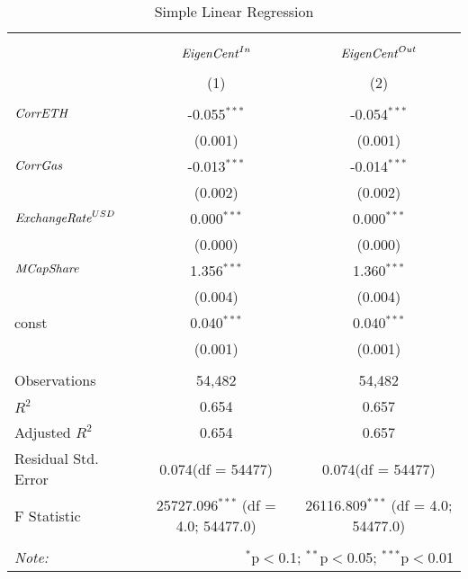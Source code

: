 \begin{table}[!htbp] \centering
  \caption{Simple Linear Regression}
\begin{tabular}{@{\extracolsep{5pt}}lcc}
\\[-1.8ex]\hline
\hline \\[-1.8ex]
\\[-1.8ex] & \multicolumn{1}{c}{${\it EigenCent}^{In}$} & \multicolumn{1}{c}{${\it EigenCent}^{Out}$}  \\
\\[-1.8ex] & (1) & (2) \\
\hline \\[-1.8ex]
 ${\it CorrETH}$ & -0.055$^{***}$ & -0.054$^{***}$ \\
  & (0.001) & (0.001) \\
 ${\it CorrGas}$ & -0.013$^{***}$ & -0.014$^{***}$ \\
  & (0.002) & (0.002) \\
 ${\it ExchangeRate}^{USD}$ & 0.000$^{***}$ & 0.000$^{***}$ \\
  & (0.000) & (0.000) \\
 ${\it MCapShare}$ & 1.356$^{***}$ & 1.360$^{***}$ \\
  & (0.004) & (0.004) \\
 const & 0.040$^{***}$ & 0.040$^{***}$ \\
  & (0.001) & (0.001) \\
\hline \\[-1.8ex]
 Observations & 54,482 & 54,482 \\
 $R^2$ & 0.654 & 0.657 \\
 Adjusted $R^2$ & 0.654 & 0.657 \\
 Residual Std. Error & 0.074(df = 54477) & 0.074(df = 54477)  \\
 F Statistic & 25727.096$^{***}$ (df = 4.0; 54477.0) & 26116.809$^{***}$ (df = 4.0; 54477.0) \\
\hline
\hline \\[-1.8ex]
\textit{Note:} & \multicolumn{2}{r}{$^{*}$p$<$0.1; $^{**}$p$<$0.05; $^{***}$p$<$0.01} \\
\end{tabular}
\end{table}